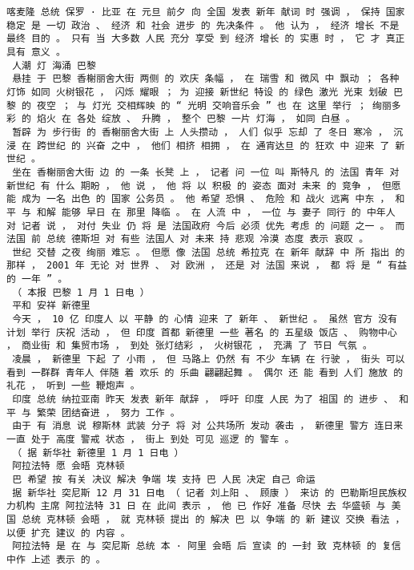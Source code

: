 \documentclass{article}
\begin{document}
\begin{Verbatim}[commandchars=\\\{\}]
 喀麦隆 总统 保罗 · 比亚 在 元旦 前夕 向 全国 发表 新年 献词 时 强调 ， 保持 国家 稳定 是 一切 政治 、 经济 和 社会 进步 的 先决条件 。 他 认为 ， 经济 增长 不是 最终 目的 。 只有 当 大多数 人民 充分 享受 到 经济 增长 的 实惠 时 ， 它 才 真正 具有 意义 。 
 人潮 灯 海涌 巴黎 
 悬挂 于 巴黎 香榭丽舍大街 两侧 的 欢庆 条幅 ， 在 瑞雪 和 微风 中 飘动 ； 各种 灯饰 如同 火树银花 ， 闪烁 耀眼 ； 为 迎接 新世纪 特设 的 绿色 激光 光束 划破 巴黎 的 夜空 ； 与 灯光 交相辉映 的 “ 光明 交响音乐会 ” 也 在 这里 举行 ； 绚丽多彩 的 焰火 在 各处 绽放 、 升腾 ， 整个 巴黎 一片 灯海 ， 如同 白昼 。 
 暂辟 为 步行街 的 香榭丽舍大街 上 人头攒动 ， 人们 似乎 忘却 了 冬日 寒冷 ， 沉浸 在 跨世纪 的 兴奋 之中 ， 他们 相挤 相拥 ， 在 通宵达旦 的 狂欢 中 迎来 了 新世纪 。 
 坐在 香榭丽舍大街 边 的 一条 长凳 上 ， 记者 问 一位 叫 斯特凡 的 法国 青年 对 新世纪 有 什么 期盼 ， 他 说 ， 他 将 以 积极 的 姿态 面对 未来 的 竞争 ， 但愿 能 成为 一名 出色 的 国家 公务员 。 他 希望 恐惧 、 危险 和 战火 远离 中东 ， 和平 与 和解 能够 早日 在 那里 降临 。 在 人流 中 ， 一位 与 妻子 同行 的 中年人 对 记者 说 ， 对付 失业 仍 将 是 法国政府 今后 必须 优先 考虑 的 问题 之一 。 而 法国 前 总统 德斯坦 对 有些 法国人 对 未来 持 悲观 冷漠 态度 表示 哀叹 。 
 世纪 交替 之夜 绚丽 难忘 。 但愿 像 法国 总统 希拉克 在 新年 献辞 中 所 指出 的 那样 ， 2001 年 无论 对 世界 、 对 欧洲 ， 还是 对 法国 来说 ， 都 将 是 “ 有益 的 一年 ” 。 
 （ 本报 巴黎 1 月 1 日电 ） 
 平和 安祥 新德里 
 今天 ， 10 亿 印度人 以 平静 的 心情 迎来 了 新年 、 新世纪 。 虽然 官方 没有 计划 举行 庆祝 活动 ， 但 印度 首都 新德里 一些 著名 的 五星级 饭店 、 购物中心 ， 商业街 和 集贸市场 ， 到处 张灯结彩 ， 火树银花 ， 充满 了 节日 气氛 。 
 凌晨 ， 新德里 下起 了 小雨 ， 但 马路上 仍然 有 不少 车辆 在 行驶 ， 街头 可以 看到 一群群 青年人 伴随 着 欢乐 的 乐曲 翩翩起舞 。 偶尔 还 能 看到 人们 施放 的 礼花 ， 听到 一些 鞭炮声 。 
 印度 总统 纳拉亚南 昨天 发表 新年 献辞 ， 呼吁 印度 人民 为了 祖国 的 进步 、 和平 与 繁荣 团结奋进 ， 努力 工作 。 
 由于 有 消息 说 穆斯林 武装 分子 将 对 公共场所 发动 袭击 ， 新德里 警方 连日来 一直 处于 高度 警戒 状态 ， 街上 到处 可见 巡逻 的 警车 。 
 （ 据 新华社 新德里 1 月 1 日电 ） 
 阿拉法特 愿 会晤 克林顿 
 巴 希望 按 有关 决议 解决 争端 埃 支持 巴 人民 决定 自己 命运 
 据 新华社 突尼斯 12 月 31 日电 （ 记者 刘上阳 、 顾康 ） 来访 的 巴勒斯坦民族权力机构 主席 阿拉法特 31 日 在 此间 表示 ， 他 已 作好 准备 尽快 去 华盛顿 与 美国 总统 克林顿 会晤 ， 就 克林顿 提出 的 解决 巴 以 争端 的 新 建议 交换 看法 ， 以便 扩充 建议 的 内容 。 
 阿拉法特 是 在 与 突尼斯 总统 本 · 阿里 会晤 后 宣读 的 一封 致 克林顿 的 复信 中作 上述 表示 的 。 

\end{Verbatim}
\end{document}
